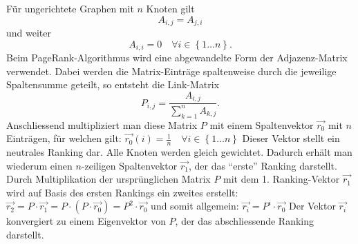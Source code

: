Für ungerichtete Graphen mit $n$ Knoten gilt \begin{equation}A_{i,j}=A_{j,i}\end{equation} und weiter
\begin{equation}
A_{i,i}=0\quad\forall i\in \left\{1\dots n\right\}.
\end{equation}
Beim PageRank-Algorithmus wird eine abgewandelte Form der Adjazenz-Matrix verwendet.
Dabei werden die Matrix-Einträge spaltenweise durch die jeweilige Spaltensumme geteilt, so entsteht die Link-Matrix
\[
P_{i,j}=\frac{A_{i,j}}{\sum_{k=1}^{n}A_{k,j}}.
\]
Anschliessend multipliziert man diese Matrix $P$ mit einem Spaltenvektor $\Vec{r_0}$ mit $n$ Einträgen, für welchen gilt:
\( \Vec{r_0}(i) = \frac{1}{n} \quad\forall i\in \left\{1\dots n\right\} \)
Dieser Vektor stellt ein neutrales Ranking dar. Alle Knoten werden gleich gewichtet.
Dadurch erhält man wiederum einen $n$-zeiligen Spaltenvektor $\Vec{r_1}$, der das ``erste'' Ranking darstellt. Durch Multiplikation der ursprünglichen Matrix $P$ mit dem 1. Ranking-Vektor $\Vec{r_1}$ wird auf Basis des ersten Rankings ein zweites erstellt:
\( \Vec{r_2} = P\cdot\Vec{r_1} = P\cdot(P\cdot\Vec{r_0}) = P^2\cdot\Vec{r_0}\)
und somit allgemein:
\( \Vec{r_i} = P^i\cdot\Vec{r_0}\)
Der Vektor $\Vec{r_i}$ konvergiert zu einem Eigenvektor von $P$, der das abschliessende Ranking darstellt.
